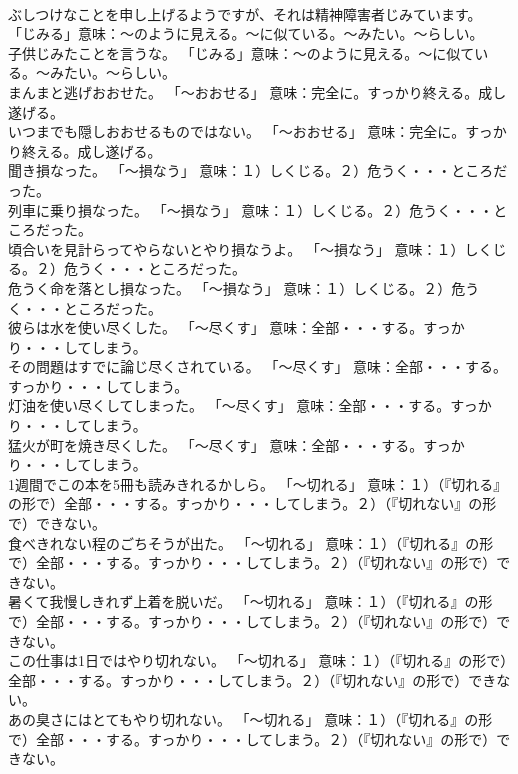 \documentclass[8pt]{extreport}
\begin{document}
\begin{CJK}{UTF8}{min}
\\	ぶしつけなことを申し上げるようですが、それは精神障害者じみています。	「じみる」意味：～のように見える。～に似ている。～みたい。～らしい。	
\\	子供じみたことを言うな。	「じみる」意味：～のように見える。～に似ている。～みたい。～らしい。	
\\	まんまと逃げおおせた。	「～おおせる」 意味：完全に。すっかり終える。成し遂げる。	
\\	いつまでも隠しおおせるものではない。	「～おおせる」 意味：完全に。すっかり終える。成し遂げる。	
\\	聞き損なった。	「～損なう」 意味：１）しくじる。２）危うく・・・ところだった。	
\\	列車に乗り損なった。	「～損なう」 意味：１）しくじる。２）危うく・・・ところだった。	
\\	頃合いを見計らってやらないとやり損なうよ。	「～損なう」 意味：１）しくじる。２）危うく・・・ところだった。	
\\	危うく命を落とし損なった。	「～損なう」 意味：１）しくじる。２）危うく・・・ところだった。	
\\	彼らは水を使い尽くした。	「～尽くす」 意味：全部・・・する。すっかり・・・してしまう。	
\\	その問題はすでに論じ尽くされている。	「～尽くす」 意味：全部・・・する。すっかり・・・してしまう。	
\\	灯油を使い尽くしてしまった。	「～尽くす」 意味：全部・・・する。すっかり・・・してしまう。	
\\	猛火が町を焼き尽くした。	「～尽くす」 意味：全部・・・する。すっかり・・・してしまう。	
\\	1週間でこの本を5冊も読みきれるかしら。	「～切れる」 意味：１）（『切れる』の形で）全部・・・する。すっかり・・・してしまう。２）（『切れない』の形で）できない。	
\\	食べきれない程のごちそうが出た。	「～切れる」 意味：１）（『切れる』の形で）全部・・・する。すっかり・・・してしまう。２）（『切れない』の形で）できない。	
\\	暑くて我慢しきれず上着を脱いだ。	「～切れる」 意味：１）（『切れる』の形で）全部・・・する。すっかり・・・してしまう。２）（『切れない』の形で）できない。	
\\	この仕事は1日ではやり切れない。	「～切れる」 意味：１）（『切れる』の形で）全部・・・する。すっかり・・・してしまう。２）（『切れない』の形で）できない。	
\\	あの臭さにはとてもやり切れない。	「～切れる」 意味：１）（『切れる』の形で）全部・・・する。すっかり・・・してしまう。２）（『切れない』の形で）できない。	

\end{CJK}
\end{document}
